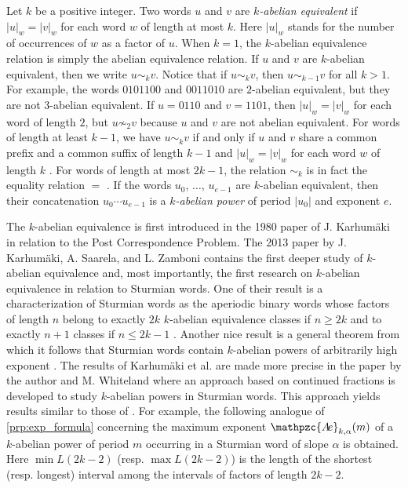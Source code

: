 \documentclass[a4paper,fleqn]{article}
\providecommand{\abs}[1]{\lvert#1\rvert}
\newcommand{\abexp}[2][]{\mathpzc{A\mkern-3mu e}_{#1}(#2)}
\begin{document}
  Let $k$ be a positive integer. Two words $u$ and $v$ are \emph{$k$-abelian equivalent} if $\abs{u}_w = \abs{v}_w$ for
  each word $w$ of length at most $k$. Here $\abs{u}_w$ stands for the number of occurrences of $w$ as a factor of $u$.
  When $k = 1$, the $k$-abelian equivalence relation is simply the abelian equivalence relation. If $u$ and $v$ are
  $k$-abelian equivalent, then we write $u \sim_k v$. Notice that if $u \sim_k v$, then $u \sim_{k-1} v$ for all
  $k > 1$. For example, the words $0101100$ and $0011010$ are $2$-abelian equivalent, but they are not $3$-abelian
  equivalent. If $u = 0110$ and $v = 1101$, then $\abs{u}_w = \abs{v}_w$ for each word of length $2$, but
  $u \not\sim_2 v$ because $u$ and $v$ are not abelian equivalent. For words of length at least $k - 1$, we have
  $u \sim_k v$ if and only if $u$ and $v$ share a common prefix and a common suffix of length $k - 1$ and
  $\abs{u}_w = \abs{v}_w$ for each word $w$ of length $k$
  \cite[Lemma~2.4]{2013:on_a_generalization_of_abelian_equivalence_and_complexity_of_infinite}. For words of length at
  most $2k - 1$, the relation $\sim_k$ is in fact the equality relation $=$
  \cite[Lemma~2.4]{2013:on_a_generalization_of_abelian_equivalence_and_complexity_of_infinite}. If the words $u_0$,
  $\ldots$, $u_{e-1}$ are $k$-abelian equivalent, then their concatenation $u_0 \cdots u_{e-1}$ is a \emph{$k$-abelian
  power} of period $\abs{u_0}$ and exponent $e$.

  The $k$-abelian equivalence is first introduced in the 1980 paper of J. Karhumäki
  \cite{1980:generalized_parikh_mappings_and_homomorphisms} in relation to the Post Correspondence Problem. The 2013
  paper \cite{2013:on_a_generalization_of_abelian_equivalence_and_complexity_of_infinite} by J. Karhumäki, A. Saarela,
  and L. Zamboni contains the first deeper study of $k$-abelian equivalence and, most importantly, the first research
  on $k$-abelian equivalence in relation to Sturmian words. One of their result is a characterization of Sturmian words
  as the aperiodic binary words whose factors of length $n$ belong to exactly $2k$ $k$-abelian equivalence classes if
  $n \geq 2k$ and to exactly $n + 1$ classes if $n \leq 2k - 1$
  \cite[Thm.~4.1]{2013:on_a_generalization_of_abelian_equivalence_and_complexity_of_infinite}. Another nice result is a
  general theorem from which it follows that Sturmian words contain $k$-abelian powers of arbitrarily high exponent
  \cite[Thm.~5.4]{2013:on_a_generalization_of_abelian_equivalence_and_complexity_of_infinite}. The results of Karhumäki
  et al. are made more precise in the paper \cite{2018:on_k-abelian_equivalence_and_generalized_lagrange_spectra} by
  the author and M. Whiteland where an approach based on continued fractions is developed to study $k$-abelian powers
  in Sturmian words. This approach yields results similar to those of
  \cite{2016:abelian_powers_and_repetitions_in_sturmian_words}. For example, the following analogue of
  \autoref{prp:exp_formula} concerning the maximum exponent $\abexp[k,\alpha]{m}$ of a $k$-abelian power of period $m$
  occurring in a Sturmian word of slope $\alpha$ is obtained. Here $\min L(2k-2)$ (resp. $\max L(2k-2)$) is the length
  of the shortest (resp. longest) interval among the intervals of factors of length $2k-2$.
\end{document}
